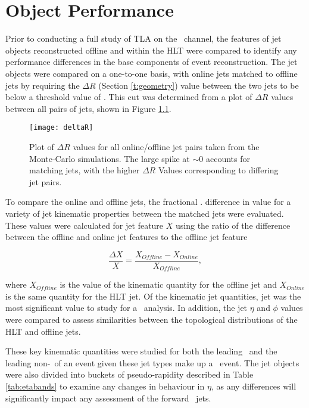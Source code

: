 \chapter{Object Performance}\label{c:OP}

Prior to conducting a full study of TLA on the \VBFHBB\, channel, the features of jet objects reconstructed offline and within the HLT were compared to identify any performance differences in the base components of event reconstruction. The jet objects were compared on a one-to-one basis, with online jets matched to offline jets by requiring the $\Delta R$ (Section \ref{t:geometry}) value between the two jets to be below a threshold value of \DELTARTHRESHOLD. This cut was determined from a plot of $\Delta R$ values between all pairs of jets, shown in Figure \ref{f:deltaR}.

\begin{figure}[h]
	\centering
	\texttt{[image: deltaR]}
	\caption[$\Delta R$ values for online/offline jet pairs in Monte-Carlo simulation]{Plot of $\Delta R$ values for all online/offline jet pairs taken from the Monte-Carlo simulations. The large spike at $\sim0$ accounts for matching jets, with the higher $\Delta R$ Values corresponding to differing jet pairs.}
	\label{f:deltaR}
\end{figure}
To compare the online and offline jets, the fractional
. difference in value for a variety of jet kinematic properties between the matched jets were evaluated. These values were calculated for jet feature $X$ using the ratio of the difference between the offline and online jet features to the offline jet feature

	\begin{equation}
	\frac{\Delta X}{X} = \frac{X_{Offline} - X_{Online}}{X_{Offline}},
	\end{equation}

	where $X_{Offline}$ is the value of the kinematic quantity for the offline jet and $X_{Online}$ is the same quantity for  the HLT jet. Of the kinematic jet quantities, jet \pt was the most significant value to study for a \VBFHBB\ analysis. In addition, the jet $\eta$ and $\phi$ values were compared to assess similarities between the topological distributions of the HLT and offline jets.

	These key kinematic quantities were studied for both the leading \bjet\ and the leading non-\bjet\, of an event given these jet types make up a \VBFHBB\ event. The jet objects were also divided into buckets of pseudo-rapidity described in Table \ref{tab:etabands} to examine any changes in behaviour in $\eta$, as any differences will significantly impact any assessment of the forward \VBFHBB\ jets.

